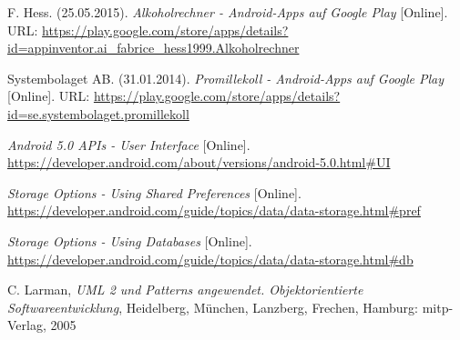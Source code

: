 \documentclass[12pt,
	a4paper,
	listof=totoc,
	bibliography=totoc,
	parskip=full*
	]{scrreprt}
\title{\mytitle}
\author{\myauthor}
\begin{document}
\begin{titlepage}

\end{titlepage}



\tableofcontents
\restoregeometry












\glsaddall
{}
\printglossary[title=Glossar]
\begin{thebibliography}{9}
	
	F. Hess. (25.05.2015). \emph{Alkoholrechner - Android-Apps auf Google Play} [Online]. URL: \url{https://play.google.com/store/apps/details?id=appinventor.ai_fabrice_hess1999.Alkoholrechner}
	
	Systembolaget AB. (31.01.2014). \emph{Promillekoll - Android-Apps auf Google Play} [Online]. URL: \url{https://play.google.com/store/apps/details?id=se.systembolaget.promillekoll}
	
	\emph{Android 5.0 APIs - User Interface} [Online]. \url{https://developer.android.com/about/versions/android-5.0.html#UI}
	
	\emph{Storage Options - Using Shared Preferences} [Online]. \url{https://developer.android.com/guide/topics/data/data-storage.html#pref}
	
	\emph{Storage Options - Using Databases} [Online]. \url{https://developer.android.com/guide/topics/data/data-storage.html#db}
	
	C. Larman, \emph{UML 2 und Patterns angewendet. Objektorientierte Softwareentwicklung}, Heidelberg, München, Lanzberg, Frechen, Hamburg: mitp-Verlag, 2005
	
	
\end{thebibliography}
\listoftables
\listoffigures
\end{document}
